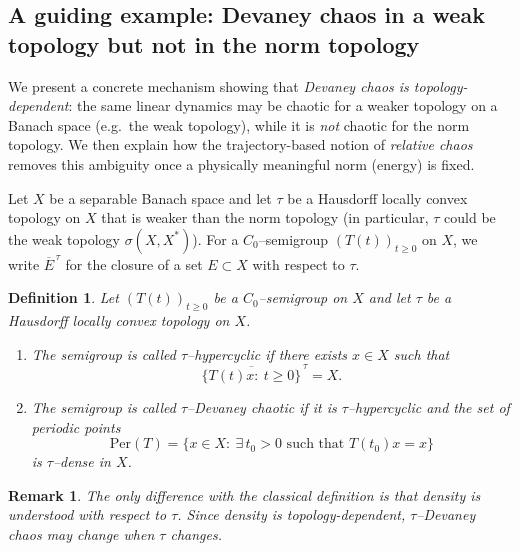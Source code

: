 \documentclass[12pt]{article}
\newtheorem{definition}[theorem]{Definition}
\newtheorem{remark}[theorem]{Remark}
\begin{document}
\subsection{A guiding example: Devaney chaos in a weak topology but not in the norm topology}
\label{subsec:weak_vs_norm_example}

We present a concrete mechanism showing that \emph{Devaney chaos is topology-dependent}: the same linear dynamics may be chaotic for a weaker topology on a Banach space (e.g.\ the weak topology), while it is \emph{not} chaotic for the norm topology. We then explain how the trajectory-based notion of \emph{relative chaos} removes this ambiguity once a physically meaningful norm (energy) is fixed.


Let $X$ be a separable Banach space and let $\tau$ be a Hausdorff locally convex topology on $X$ that is weaker than the norm topology (in particular, $\tau$ could be the weak topology $\sigma(X,X^\ast)$). For a $C_0$--semigroup $(T(t))_{t\ge 0}$ on $X$, we write $\overline{E}^{\,\tau}$ for the closure of a set $E\subset X$ with respect to $\tau$.

\begin{definition} {\cite{DeschSchappacherWebb1997,GrosseErdmannPeris2011}}
\label{def:devaney_tau}
Let $(T(t))_{t\ge 0}$ be a $C_0$--semigroup on $X$ and let $\tau$ be a Hausdorff locally convex topology on $X$.
\begin{enumerate}
\item The semigroup is called \emph{$\tau$--hypercyclic} if there exists $x\in X$ such that
\[
\overline{\{T(t)x:\ t\ge 0\}}^{\,\tau}=X.
\]
\item The semigroup is called \emph{$\tau$--Devaney chaotic} if it is $\tau$--hypercyclic and the set of periodic points
\[
\mathrm{Per}(T)=\{x\in X:\ \exists\,t_0>0 \text{ such that } T(t_0)x=x\}
\]
is $\tau$--dense in $X$.
\end{enumerate}
\end{definition}

\begin{remark}
The only difference with the classical definition is that \emph{density} is understood with respect to $\tau$. Since density is topology-dependent, $\tau$--Devaney chaos may change when $\tau$ changes.
\end{remark}
\end{document}
